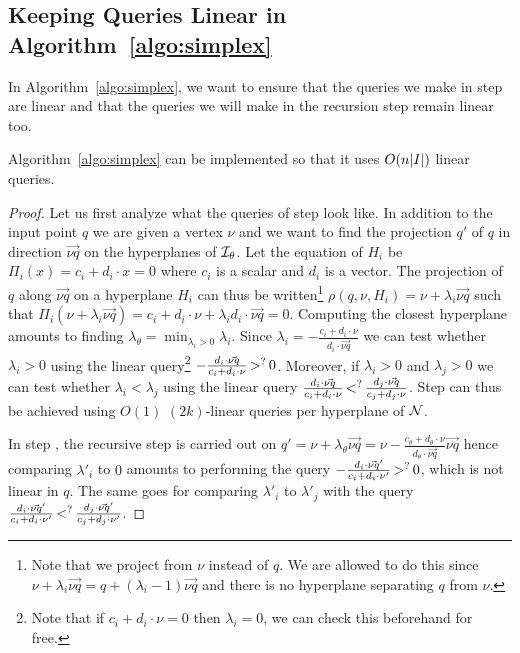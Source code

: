 \subsection{Keeping Queries Linear in Algorithm~\ref*{algo:simplex}}%
\label{app:keeplinear}

In Algorithm~\ref{algo:simplex}, we want to ensure that the queries we make in step
 are linear and that the queries we will make in the recursion step
remain linear too.
\begin{lemma}
	Algorithm~\ref{algo:simplex} can be implemented so that it uses $O(n|{I}|)$ linear queries.
\end{lemma}%
\begin{proof}
Let us first analyze what the queries of step  look like. In addition
to the input point \(q\) we are given a vertex \(\nu\) and we want to find the
projection \(q'\) of \(q\) in direction \(\vec{\nu q}\) on the hyperplanes of
\(\mathcal{I}_{\theta}\). Let the equation of \(H_{i}\) be \(\Pi_{i}(x) =
c_{i} + d_{i}
\cdot x = 0\) where \(c_{i}\) is a scalar and \(d_{i}\) is a
vector.
The projection of \(q\) along \(\vec{\nu q}\) on a hyperplane \(H_i\) can thus
be written\footnote{Note that we project from \(\nu\) instead of \(q\). We are
allowed to do this since \(\nu + \lambda_{i} \vec{\nu q} = q + (\lambda_i - 1)
\vec{\nu q}\) and there is no hyperplane
separating \(q\) from \(\nu\).}
\(\rho(q,\nu,H_i) = \nu + \lambda_{i} \vec{\nu q}\) such that \(\Pi_{i}(\nu +
		\lambda_{i} \vec{\nu q}) = c_{i} + d_{i} \cdot \nu +
		\lambda_{i} d_{i} \cdot
\vec{\nu q} = 0\). Computing the closest hyperplane amounts to finding
\(\lambda_{\theta} = \min_{\lambda_i > 0} \lambda_i\). Since \(\lambda_i = -
\frac{c_i + d_i \cdot \nu}{d_i \cdot \vec{\nu q}}\) we can test whether
\(\lambda_i > 0\)
using the linear query\footnote{Note that if $c_i + d_i \cdot \nu = 0$ then
$\lambda_i=0$, we can check this beforehand for free.}
\(-\frac{d_i \cdot \vec{\nu q}}{c_i + d_i
\cdot \nu} \mathop{>}^{?} 0\). Moreover, if \(\lambda_i > 0\) and \(\lambda_j > 0\)
we can test whether $\lambda_i < \lambda_j$ using the linear query \(
\frac{d_i \cdot \vec{\nu q}}{c_i + d_i \cdot \nu}
\mathop{<}^{?}
\frac{d_j \cdot \vec{\nu q}}{c_j + d_j \cdot \nu}\).
Step  can thus be achieved using \(O(1)\) \((2k)\)-linear queries per
hyperplane of \(\mathcal{N}\).

In step , the
recursive step is carried out on \(q' = \nu + \lambda_{\theta} \vec{\nu q} = \nu -
\frac{c_{\theta} + d_{\theta} \cdot \nu}{d_{\theta} \cdot \vec{\nu q}}
\vec{\nu q}\) hence comparing \(\lambda'_i\) to \(0\) amounts to performing the
query \(-\frac{d_i \cdot \vec{\nu q}'}{c_i + d_i \cdot \nu'}
\mathop{>}^{?} 0\), which is not linear in \(q\). The same goes for comparing
\(\lambda'_i\) to \(\lambda'_j\) with the query
\(\frac{d_i \cdot \vec{\nu q}'}{c_i + d_i \cdot \nu'}
\mathop{<}^{?}
\frac{d_j \cdot \vec{\nu q}'}{c_j + d_j \cdot \nu'}\).


\end{proof}
